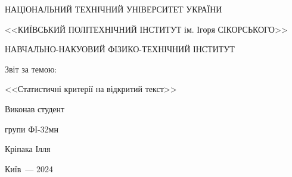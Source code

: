 
	\thispagestyle{empty}
	
	\begin{center}
		НАЦІОНАЛЬНИЙ ТЕХНІЧНИЙ УНІВЕРСИТЕТ УКРАЇНИ \par
		<<КИЇВСЬКИЙ ПОЛІТЕХНІЧНИЙ ІНСТИТУТ ім. Ігоря СІКОРСЬКОГО>>\par
		НАВЧАЛЬНО-НАКУОВИЙ ФІЗИКО-ТЕХНІЧНИЙ ІНСТИТУТ\par
		
		\vspace{60mm}
		{\huge Звіт за темою:\par
			\LARGE <<Статистичні критерії на відкритий текст>>\par}
		
	\end{center}
	
	\vspace{40mm}
	\begin{flushright}
		Виконав студент
		
		групи ФІ-32мн
		
		Кріпака Ілля
		
	\end{flushright}
	
	\vspace{27mm}
	\begin{center}
		{Київ~--- 2024}
	\end{center}
	